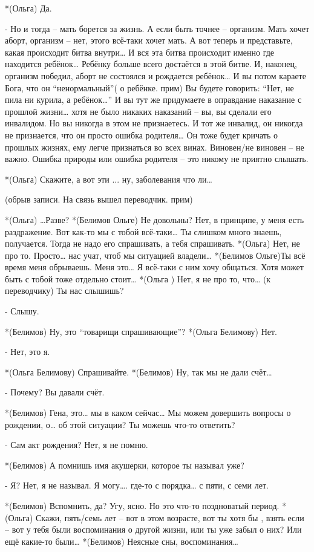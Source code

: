 *(Ольга) Да.

- Но и тогда – мать борется за жизнь. А если быть точнее – организм. Мать хочет аборт, организм – нет, этого всё-таки хочет мать. А вот теперь и представьте, какая происходит битва внутри… И вся эта битва происходит именно где находится ребёнок… Ребёнку больше всего достаётся в этой битве. И, наконец, организм победил, аборт не состоялся и рождается ребёнок… И вы потом караете Бога, что он “ненормальный”( о ребёнке. прим) Вы будете говорить: “Нет, не пила ни курила, а ребёнок…” И вы тут же придумаете в оправдание наказание с прошлой жизни… хотя не было никаких наказаний – вы, вы сделали его инвалидом. Но вы никогда в этом не признаетесь. И тот же инвалид, он никогда не признается, что он просто ошибка родителя… Он тоже будет кричать о прошлых жизнях, ему легче признаться во всех винах. Виновен/не виновен – не важно. Ошибка природы или ошибка родителя – это никому не приятно слышать.



*(Ольга) Скажите, а вот эти ... ну, заболевания что ли…

(обрыв записи. На связь вышел переводчик. прим)

*(Ольга) …Разве?
*(Белимов Ольге) Не довольны? Нет, в принципе, у меня есть раздражение. Вот как-то мы с тобой всё-таки… Ты слишком много знаешь, получается. Тогда не надо его спрашивать, а тебя спрашивать.
*(Ольга) Нет, не про то. Просто… нас учат, чтоб мы ситуацией владели…
*(Белимов Ольге)Ты всё время меня обрываешь. Меня это… Я всё-таки с ним хочу общаться. Хотя может быть с тобой тоже отдельно стоит…
*(Ольга ) Нет, я не про то, что…  (к переводчику) Ты нас слышишь?

- Слышу.

*(Белимов) Ну, это “товарищи спрашивающие”?
*(Ольга Белимову) Нет.

- Нет, это я.

*(Ольга Белимову) Спрашивайте.
*(Белимов) Ну, так мы не дали счёт…

- Почему? Вы давали счёт.

*(Белимов) Гена, это… мы в каком сейчас… Мы можем довершить вопросы о рождении, о… об этой ситуации? Ты можешь что-то ответить?

- Сам акт рождения? Нет, я не помню. 

*(Белимов) А помнишь имя акушерки, которое ты называл уже?

- Я? Нет, я не называл. Я могу…. где-то с порядка… с пяти, с семи лет. 

*(Белимов) Вспомнить, да? Угу, ясно. Но это что-то поздноватый период.
*(Ольга) Скажи, пять/семь лет – вот в этом возрасте, вот ты хотя бы , взять если – вот у тебя были воспоминания о другой жизни, или ты уже забыл о них? Или ещё какие-то были…
*(Белимов) Неясные сны, воспоминания…

